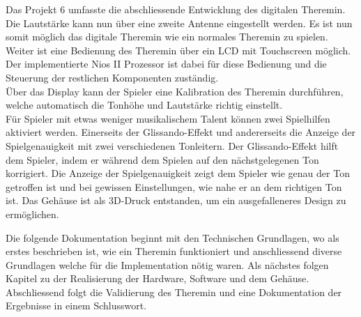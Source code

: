 Das Projekt 6 umfasste die abschliessende Entwicklung des digitalen Theremin. Die Lautstärke kann nun über eine zweite Antenne eingestellt werden. Es ist nun somit möglich das digitale Theremin wie ein normales Theremin zu spielen.\\
Weiter ist eine Bedienung des Theremin über ein LCD mit Touchscreen möglich. Der implementierte Nios II Prozessor ist dabei für diese Bedienung und die Steuerung der restlichen Komponenten zuständig.\\
Über das Display kann der Spieler eine Kalibration des Theremin durchführen, welche automatisch die Tonhöhe und Lautstärke richtig einstellt.\\
Für Spieler mit etwas weniger musikalischem Talent können zwei Spielhilfen aktiviert werden. Einerseits der Glissando-Effekt und andererseits die Anzeige der Spielgenauigkeit mit zwei verschiedenen Tonleitern. Der Glissando-Effekt hilft dem Spieler, indem er während dem Spielen auf den nächstgelegenen Ton korrigiert. Die Anzeige der Spielgenauigkeit zeigt dem Spieler wie genau der Ton getroffen ist und bei gewissen Einstellungen, wie nahe er an dem richtigen Ton ist.
Das Gehäuse ist als 3D-Druck entstanden, um ein ausgefalleneres Design zu ermöglichen.


Die folgende Dokumentation beginnt mit den Technischen Grundlagen, wo als erstes beschrieben ist, wie ein Theremin funktioniert und anschliessend diverse Grundlagen welche für die Implementation nötig waren. Als nächstes folgen Kapitel zu der Realisierung der Hardware, Software und dem Gehäuse. Abschliessend folgt die Validierung des Theremin und eine Dokumentation der Ergebnisse in einem Schlusswort.






